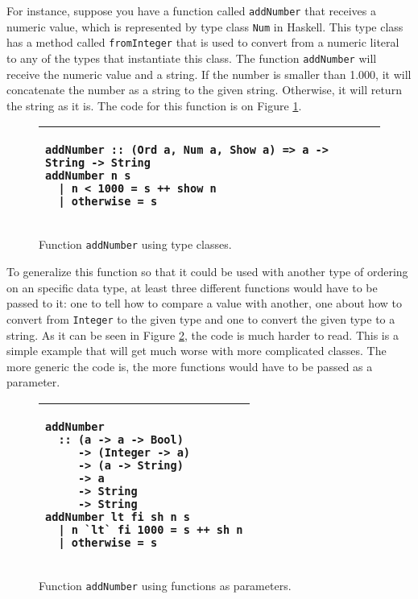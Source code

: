 \documentclass[msc]{ppgccufmg}
\begin{document}
For instance, suppose you have a function called \texttt{addNumber} that receives a numeric value, which is represented by type class \texttt{Num} in Haskell.
This type class has a method called \texttt{fromInteger} that is used to convert from a numeric literal to any of the types that instantiate this class.
The function \texttt{addNumber} will receive the numeric value and a string.
If the number is smaller than 1.000, it will concatenate the number as a string to the given string.
Otherwise, it will return the string as it is.
The code for this function is on Figure \ref{classExample}.

\begin{figure}
\caption{Function \texttt{addNumber} using type classes.\label{classExample}}
\begin{tabular}{|p{\textwidth}|}
\hline
\begin{verbatim}
addNumber :: (Ord a, Num a, Show a) => a -> String -> String
addNumber n s
  | n < 1000 = s ++ show n
  | otherwise = s
\end{verbatim}
\\
\hline
\end{tabular}
\end{figure}

To generalize this function so that it could be used with another type of ordering on an specific data type, at least three different functions would have to be passed to it: one to tell how to compare a value with another, one about how to convert from \texttt{Integer} to the given type and one to convert the given type to a string.
As it can be seen in Figure \ref{byExample}, the code is much harder to read.
This is a simple example that will get much worse with more complicated classes.
The more generic the code is, the more functions would have to be passed as a parameter.

\begin{figure}
\caption{Function \texttt{addNumber} using functions as parameters.\label{byExample}}
\begin{tabular}{|p{\textwidth}|}
\hline
\begin{verbatim}
addNumber
  :: (a -> a -> Bool)
     -> (Integer -> a)
     -> (a -> String)
     -> a
     -> String
     -> String
addNumber lt fi sh n s
  | n `lt` fi 1000 = s ++ sh n
  | otherwise = s
\end{verbatim}
\\
\hline
\end{tabular}
\end{figure}
\end{document}
